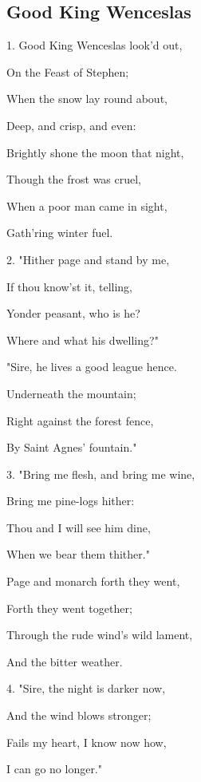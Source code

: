 \subsection{Good King Wenceslas}\label{wenceslas}
\begin{description}[nosep,leftmargin=\parindent,labelsep=0pt]
\item 1. Good King Wenceslas look'd out, 
\item On the Feast of Stephen; 
\item When the snow lay round about, 
\item Deep, and crisp, and even: 
\item Brightly shone the moon that night, 
\item Though the frost was cruel, 
\item When a poor man came in sight, 
\item Gath'ring winter fuel. 
\vspace{1.5ex}
\item 2. "Hither page and stand by me, 
\item If thou know'st it, telling, 
\item Yonder peasant, who is he? 
\item Where and what his dwelling?" 
\item "Sire, he lives a good league hence. 
\item Underneath the mountain; 
\item Right against the forest fence, 
\item By Saint Agnes' fountain." 
\vspace{1.5ex}
\item 3. "Bring me flesh, and bring me wine, 
\item Bring me pine-logs hither: 
\item Thou and I will see him dine, 
\item When we bear them thither." 
\item Page and monarch forth they went, 
\item Forth they went together; 
\item Through the rude wind's wild lament, 
\item And the bitter weather. 
\vspace{1.5ex}
\item 4. "Sire, the night is darker now, 
\item And the wind blows stronger; 
\item Fails my heart, I know now how, 
\item I can go no longer." 

\end{description}
